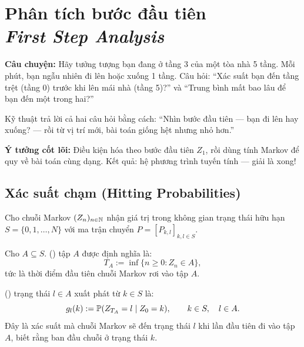\chapter{Phân tích bước đầu tiên\\{\normalsize\textit{First Step Analysis}}}
\label{ch:first-step}

\textbf{Câu chuyện:} Hãy tưởng tượng bạn đang ở tầng 3 của một tòa nhà 5 tầng.
Mỗi phút, bạn ngẫu nhiên đi lên hoặc xuống 1 tầng. Câu hỏi:
``Xác suất bạn đến tầng trệt (tầng 0) trước khi lên mái nhà (tầng 5)?''
và ``Trung bình mất bao lâu để bạn đến một trong hai?''

Kỹ thuật  trả lời cả hai câu hỏi bằng cách:
``Nhìn bước đầu tiên --- bạn đi lên hay xuống? --- rồi từ vị trí mới, bài toán giống hệt nhưng nhỏ hơn.''

\begin{tomtat}
\textbf{Ý tưởng cốt lõi:} Điều kiện hóa theo bước đầu tiên $Z_1$, rồi dùng tính Markov
để quy về bài toán cùng dạng. Kết quả: hệ phương trình tuyến tính --- giải là xong!
\end{tomtat}

\section{Xác suất chạm (Hitting Probabilities)}
\label{sec:hitting-prob}

Cho chuỗi Markov $(Z_n)_{n \in \mathbb{N}}$ nhận giá trị trong không gian trạng thái hữu hạn
$S = \{0, 1, \ldots, N\}$ với ma trận chuyển $P = [P_{k,l}]_{k,l \in S}$.

\begin{dinhnghia}
Cho $A \subseteq S$.  () tập $A$ được định nghĩa là:
\[
  T_A := \inf\{n \geq 0 : Z_n \in A\},
\]
tức là thời điểm đầu tiên chuỗi Markov rơi vào tập $A$.
\end{dinhnghia}

\begin{dinhnghia}
 () trạng thái $l \in A$ xuất phát từ $k \in S$ là:
\[
  g_l(k) := \mathbb{P}(Z_{T_A} = l \mid Z_0 = k), \qquad k \in S, \quad l \in A.
\]
Đây là xác suất mà chuỗi Markov sẽ đến trạng thái $l$ khi lần đầu tiên đi vào tập $A$,
biết rằng ban đầu chuỗi ở trạng thái $k$.
\end{dinhnghia}

